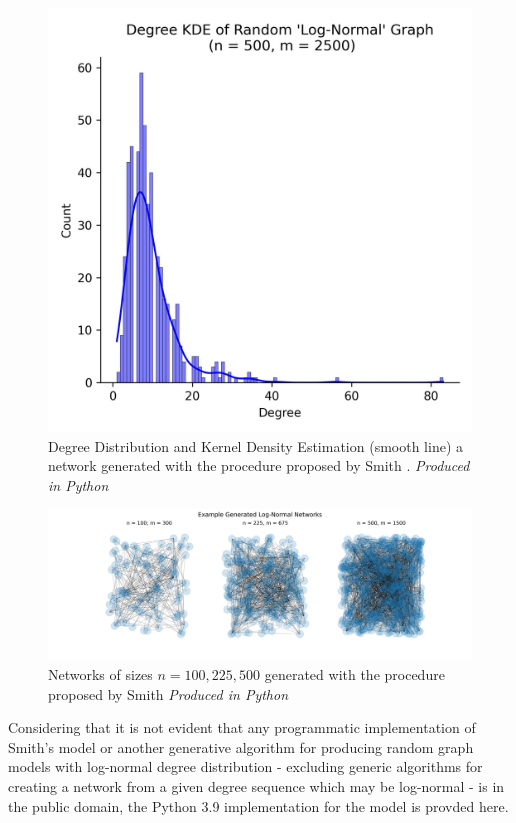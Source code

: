 \documentclass[
	a4paper, %
	10pt, %
	unnumberedsections, %
	twoside, %
]{LTJournalArticle}
\begin{document}
\begin{figure}[H] %
	\includegraphics[width=\linewidth]{Figures/ln/ln_degree_dist.jpg}
	\caption{Degree Distribution and Kernel Density Estimation (smooth line) a network generated with the procedure proposed by Smith \cite{smith:21}. \emph{Produced in Python}}
	\label{fig:ln_degree_dist}
\end{figure}

\begin{figure}
	\includegraphics[width=\linewidth]{Figures/ln/example_sizes.jpg}
	\caption{Networks of sizes \(n = 100, 225, 500\) generated with the procedure proposed by Smith \cite{smith:21}\emph{Produced in Python}}
	\label{fig:ln_example_sizes}
\end{figure}

Considering that it is not evident that any programmatic implementation of Smith's model \cite{smith:21} or another generative algorithm for producing random graph models with log-normal degree distribution - excluding generic algorithms for creating a network from a given degree sequence which may be log-normal - is in the public domain, the Python 3.9 implementation for the model is provded here. 
\end{document}
